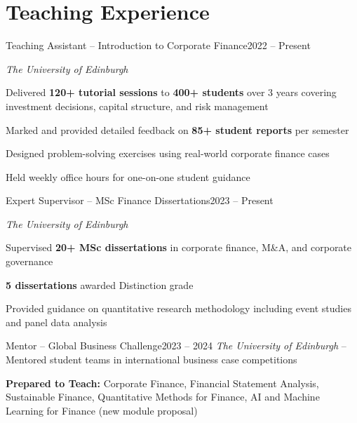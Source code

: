 \section{Teaching Experience}

\begin{joblong}{Teaching Assistant -- Introduction to Corporate Finance}{2022 -- Present}
\item \textit{The University of Edinburgh}
\item Delivered \textbf{120+ tutorial sessions} to \textbf{400+ students} over 3 years covering investment decisions, capital structure, and risk management
\item Marked and provided detailed feedback on \textbf{85+ student reports} per semester
\item Designed problem-solving exercises using real-world corporate finance cases
\item Held weekly office hours for one-on-one student guidance
\end{joblong}

\vspace{4pt}

\begin{joblong}{Expert Supervisor -- MSc Finance Dissertations}{2023 -- Present}
\item \textit{The University of Edinburgh}
\item Supervised \textbf{20+ MSc dissertations} in corporate finance, M\&A, and corporate governance
\item \textbf{5 dissertations} awarded Distinction grade
\item Provided guidance on quantitative research methodology including event studies and panel data analysis
\end{joblong}

\vspace{4pt}

\begin{jobshort}{Mentor -- Global Business Challenge}{2023 -- 2024}
\textit{The University of Edinburgh} -- Mentored student teams in international business case competitions
\end{jobshort}

\vspace{4pt}

\noindent\textbf{Prepared to Teach:} Corporate Finance, Financial Statement Analysis, Sustainable Finance, Quantitative Methods for Finance, AI and Machine Learning for Finance (new module proposal)
